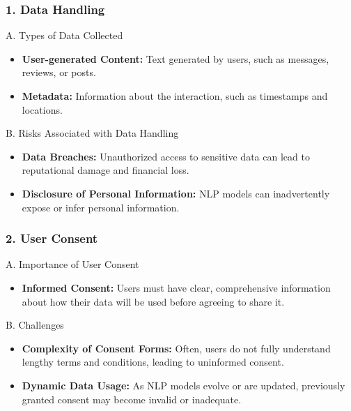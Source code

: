 \documentclass[aspectratio=169]{beamer}
\begin{document}
\begin{frame}[fragile]
    \frametitle{1. Data Handling}
    
    \begin{block}{A. Types of Data Collected}
        \begin{itemize}
            \item \textbf{User-generated Content:} Text generated by users, such as messages, reviews, or posts.
            \item \textbf{Metadata:} Information about the interaction, such as timestamps and locations.
        \end{itemize}
    \end{block}
    
    \begin{block}{B. Risks Associated with Data Handling}
        \begin{itemize}
            \item \textbf{Data Breaches:} Unauthorized access to sensitive data can lead to reputational damage and financial loss.
            \item \textbf{Disclosure of Personal Information:} NLP models can inadvertently expose or infer personal information.
        \end{itemize}
    \end{block}
\end{frame}

\begin{frame}[fragile]
    \frametitle{2. User Consent}
    
    \begin{block}{A. Importance of User Consent}
        \begin{itemize}
            \item \textbf{Informed Consent:} Users must have clear, comprehensive information about how their data will be used before agreeing to share it.
        \end{itemize}
    \end{block}
    
    \begin{block}{B. Challenges}
        \begin{itemize}
            \item \textbf{Complexity of Consent Forms:} Often, users do not fully understand lengthy terms and conditions, leading to uninformed consent.
            \item \textbf{Dynamic Data Usage:} As NLP models evolve or are updated, previously granted consent may become invalid or inadequate.
        \end{itemize}
    \end{block}
\end{frame}
\end{document}
